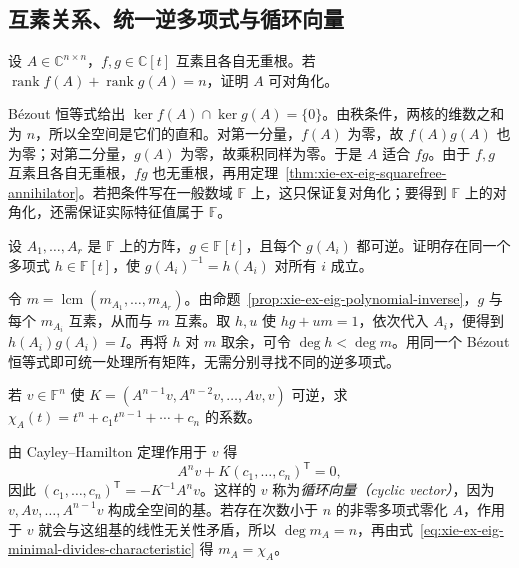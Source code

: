 \subsection{互素关系、统一逆多项式与循环向量}

\begin{example}
设 $A\in\mathbb C^{n\times n}$，$f,g\in\mathbb C[t]$ 互素且各自无重根。若 $\operatorname{rank}f(A)+\operatorname{rank}g(A)=n$，证明 $A$ 可对角化。
\end{example}
\begin{solve}
Bézout 恒等式给出 $\ker f(A)\cap\ker g(A)=\{0\}$。由秩条件，两核的维数之和为 $n$，所以全空间是它们的直和。对第一分量，$f(A)$ 为零，故 $f(A)g(A)$ 也为零；对第二分量，$g(A)$ 为零，故乘积同样为零。于是 $A$ 适合 $fg$。由于 $f,g$ 互素且各自无重根，$fg$ 也无重根，再用定理~\ref{thm:xie-ex-eig-squarefree-annihilator}。若把条件写在一般数域 $\mathbb F$ 上，这只保证复对角化；要得到 $\mathbb F$ 上的对角化，还需保证实际特征值属于 $\mathbb F$。
\end{solve}

\begin{example}
设 $A_1,\ldots,A_r$ 是 $\mathbb F$ 上的方阵，$g\in\mathbb F[t]$，且每个 $g(A_i)$ 都可逆。证明存在同一个多项式 $h\in\mathbb F[t]$，使 $g(A_i)^{-1}=h(A_i)$ 对所有 $i$ 成立。
\end{example}
\begin{solve}
令 $m=\operatorname{lcm}(m_{A_1},\ldots,m_{A_r})$。由命题~\ref{prop:xie-ex-eig-polynomial-inverse}，$g$ 与每个 $m_{A_i}$ 互素，从而与 $m$ 互素。取 $h,u$ 使 $hg+um=1$，依次代入 $A_i$，便得到 $h(A_i)g(A_i)=I$。再将 $h$ 对 $m$ 取余，可令 $\deg h<\deg m$。用同一个 Bézout 恒等式即可统一处理所有矩阵，无需分别寻找不同的逆多项式。
\end{solve}

\begin{example}
若 $v\in\mathbb F^n$ 使 $K=(A^{n-1}v,A^{n-2}v,\ldots,Av,v)$ 可逆，求 $\chi_A(t)=t^n+c_1t^{n-1}+\cdots+c_n$ 的系数。
\end{example}
\begin{solve}
由 Cayley--Hamilton 定理作用于 $v$ 得
\[
A^nv+K(c_1,\ldots,c_n)^{\mathsf T}=0,
\]
因此 $(c_1,\ldots,c_n)^{\mathsf T}=-K^{-1}A^nv$。这样的 $v$ 称为\emph{循环向量（cyclic vector）}，因为 $v,Av,\ldots,A^{n-1}v$ 构成全空间的基。若存在次数小于 $n$ 的非零多项式零化 $A$，作用于 $v$ 就会与这组基的线性无关性矛盾，所以 $\deg m_A=n$，再由式~\eqref{eq:xie-ex-eig-minimal-divides-characteristic} 得 $m_A=\chi_A$。
\end{solve}

